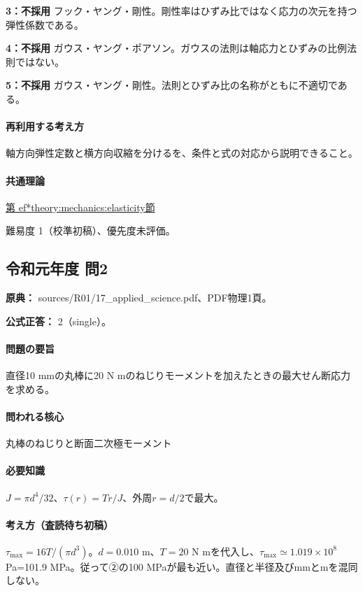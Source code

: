 \noindent\textbf{3：不採用} フック・ヤング・剛性。剛性率はひずみ比ではなく応力の次元を持つ弾性係数である。\par

\noindent\textbf{4：不採用} ガウス・ヤング・ポアソン。ガウスの法則は軸応力とひずみの比例法則ではない。\par

\noindent\textbf{5：不採用} ガウス・ヤング・剛性。法則とひずみ比の名称がともに不適切である。\par

\paragraph{再利用する考え方} 軸方向弾性定数と横方向収縮を分けるを、条件と式の対応から説明できること。

\paragraph{共通理論} \hyperref[theory:mechanics:elasticity]{第
ef*{theory:mechanics:elasticity}節}

\par 難易度 1（校準初稿）、優先度未評価。

\subsection{令和元年度 問2}
\label{q:r01-reg-applied-02}

\noindent\textbf{原典：} sources/R01/17\_applied\_science.pdf、PDF物理1頁。

\textbf{公式正答：} 2（single）。

\paragraph{問題の要旨} 直径10 mmの丸棒に20 N mのねじりモーメントを加えたときの最大せん断応力を求める。

\paragraph{問われる核心} 丸棒のねじりと断面二次極モーメント

\paragraph{必要知識} \(J=\pi d^4/32\)、\(\tau(r)=Tr/J\)、外周\(r=d/2\)で最大。

\paragraph{考え方（査読待ち初稿）} \(\tau_{\max}=16T/(\pi d^3)\)。\(d=0.010\) m、\(T=20\) N mを代入し、\(\tau_{\max}\simeq1.019\times10^8\) Pa=101.9 MPa。従って②の100 MPaが最も近い。直径と半径及びmmとmを混同しない。

